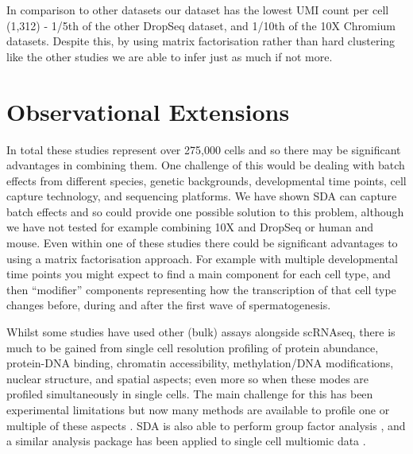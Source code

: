 In comparison to other datasets our dataset has the lowest UMI count per cell (1,312) - 1/5th of the other DropSeq dataset, and 1/10th of the 10X Chromium datasets. Despite this, by using matrix factorisation rather than hard clustering like the other studies we are able to infer just as much if not more.

\section{Observational Extensions}

In total these studies represent over 275,000 cells and so there may be significant advantages in combining them. One challenge of this would be dealing with batch effects from different species, genetic backgrounds, developmental time points, cell capture technology, and sequencing platforms. We have shown SDA can capture batch effects and so could provide one possible solution to this problem, although we have not tested for example combining 10X and DropSeq or human and mouse. Even within one of these studies there could be significant advantages to using a matrix factorisation approach. For example with multiple developmental time points you might expect to find a main component for each cell type, and then ``modifier'' components representing how the transcription of that cell type changes before, during and after the first wave of spermatogenesis.

Whilst some studies \parencite{Ernst2019Staged} have used other (bulk) assays alongside scRNAseq, there is much to be gained from single cell resolution profiling of protein abundance, protein-DNA binding, chromatin accessibility, methylation/DNA modifications, nuclear structure, and spatial aspects; even more so when these modes are profiled simultaneously in single cells. The main challenge for this has been experimental limitations but now many methods are available to profile one or multiple of these aspects \parencite[reviewed in][]{Chappell2018SingleCell, Hu2018Single, Stuart2019Integrative, Heriche2019Integrating}. SDA is also able to perform group factor analysis \parencite{Hore2015Latent}, and a similar analysis package has been applied to single cell multiomic data \parencite{Argelaguet2019Multiomics}.

